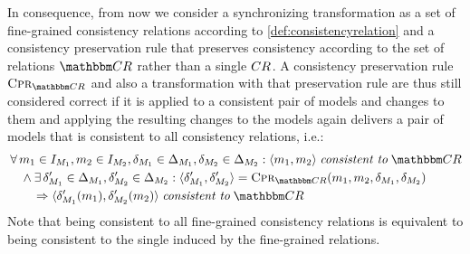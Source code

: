 In consequence, from now we consider a synchronizing transformation as a set of fine-grained consistency relations according to \autoref{def:consistencyrelation} and a consistency preservation rule that preserves consistency according to the set of relations $\consistencyrelationset{CR}$ rather than a single \modellevelconsistencyrelation $CR_{}$.
A consistency preservation rule $\consistencypreservationrule{\consistencyrelationset{CR}}$ and also a transformation with that preservation rule are thus still considered correct if it is applied to a consistent pair of models and changes to them and applying the resulting changes to the models again delivers a pair of models that is consistent to all consistency relations, i.e.:
\begin{align*}
    &
    \forall \model{m}{1} \in \metamodelinstanceset{M}{1}, \model{m}{2} \in \metamodelinstanceset{M}{2}, \change{\metamodel{M}{1}} \in \changeuniverse{\metamodel{M}{1}}, \change{\metamodel{M}{2}} \in \changeuniverse{\metamodel{M}{2}} : \tupled{\model{m}{1},\model{m}{2}} \consistenttomath \consistencyrelationset{CR} \\
    & \formulaskip
    \land \exists \change{\metamodel{M}{1}}' \in \changeuniverse{\metamodel{M}{1}}, \change{\metamodel{M}{2}}' \in \changeuniverse{\metamodel{M}{2}} : \tupled{\change{\metamodel{M}{1}}', \change{\metamodel{M}{2}}'} = \consistencypreservationrule{\consistencyrelationset{CR}}(\model{m}{1}, \model{m}{2}, \change{\metamodel{M}{1}}, \change{\metamodel{M}{2}}) \\
    & \formulaskip\formulaskip
    \Rightarrow \tupled{\change{\metamodel{M}{1}}'(\model{m}{1}),\change{\metamodel{M}{2}}'(\model{m}{2})} \consistenttomath \consistencyrelationset{CR}
\end{align*}
Note that being consistent to all fine-grained consistency relations is equivalent to being consistent to the single \modellevelconsistencyrelation induced by the fine-grained relations.


